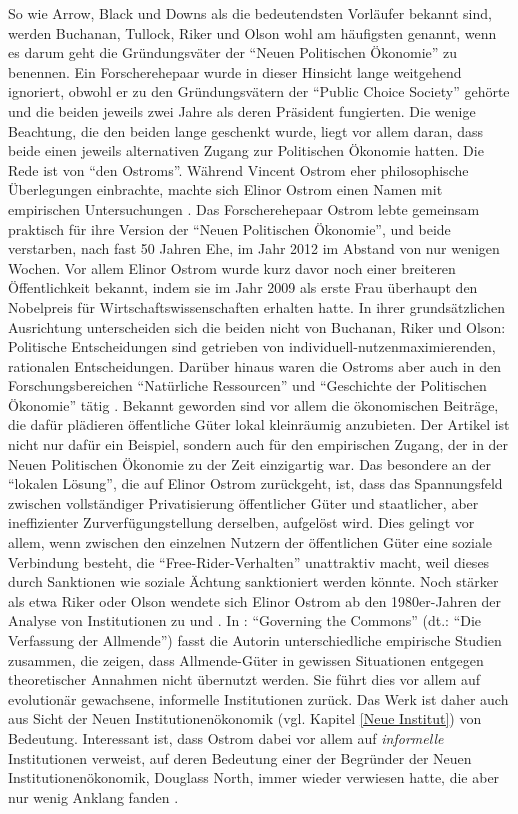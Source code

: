 So wie Arrow, Black und Downs als die bedeutendsten Vorläufer bekannt sind, werden Buchanan, Tullock, Riker und Olson wohl am häufigsten genannt, wenn es darum geht die Gründungsväter der "`Neuen Politischen Ökonomie"' zu benennen. Ein Forscherehepaar wurde in dieser Hinsicht lange weitgehend ignoriert, obwohl er zu den Gründungsvätern der "`Public Choice Society"' gehörte und die beiden jeweils zwei Jahre als deren Präsident fungierten. Die wenige Beachtung, die den beiden lange geschenkt wurde, liegt vor allem daran, dass beide einen jeweils alternativen Zugang zur Politischen Ökonomie hatten. Die Rede ist von "`den Ostroms"'. Während Vincent Ostrom eher philosophische Überlegungen einbrachte, machte sich Elinor Ostrom einen Namen mit empirischen Untersuchungen \parencite[S. 110]{Mitchell1988}. Das Forscherehepaar Ostrom lebte gemeinsam praktisch für ihre Version der "`Neuen Politischen Ökonomie"', und beide verstarben, nach fast 50 Jahren Ehe, im Jahr 2012 im Abstand von nur wenigen Wochen. Vor allem Elinor Ostrom wurde kurz davor noch einer breiteren Öffentlichkeit bekannt, indem sie im Jahr 2009 als erste Frau überhaupt den Nobelpreis für Wirtschaftswissenschaften erhalten hatte. In ihrer grundsätzlichen Ausrichtung unterscheiden sich die beiden nicht von Buchanan, Riker und Olson: Politische Entscheidungen sind getrieben von individuell-nutzenmaximierenden, rationalen Entscheidungen. Darüber hinaus waren die  Ostroms aber auch in den Forschungsbereichen "`Natürliche Ressourcen"' und "`Geschichte der Politischen Ökonomie"' tätig \textcite[S. 111]{Mitchell1988}. Bekannt geworden sind vor allem die ökonomischen Beiträge, die dafür plädieren öffentliche Güter lokal kleinräumig anzubieten. Der Artikel \textcite{Ostrom1973} ist nicht nur dafür ein Beispiel, sondern auch für den empirischen Zugang, der in der Neuen Politischen Ökonomie zu der Zeit einzigartig war. Das besondere an der "`lokalen Lösung"', die auf Elinor Ostrom zurückgeht, ist, dass das Spannungsfeld zwischen vollständiger Privatisierung öffentlicher Güter und staatlicher, aber ineffizienter Zurverfügungstellung derselben, aufgelöst wird. Dies gelingt vor allem, wenn zwischen den einzelnen Nutzern der öffentlichen Güter eine soziale Verbindung besteht, die "`Free-Rider-Verhalten"' unattraktiv macht, weil dieses durch Sanktionen wie soziale Ächtung sanktioniert werden könnte. Noch stärker als etwa Riker oder Olson wendete sich Elinor Ostrom ab den 1980er-Jahren der Analyse von Institutionen zu \parencite{Ostrom1986} und \parencite{Ostrom1990}. In \textcite{Ostrom1990}: "`Governing the Commons"' (dt.: "`Die Verfassung der Allmende"') fasst die Autorin unterschiedliche empirische Studien zusammen, die zeigen, dass Allmende-Güter in gewissen Situationen entgegen theoretischer Annahmen nicht übernutzt werden. Sie führt dies vor allem auf evolutionär gewachsene, informelle Institutionen zurück. Das Werk ist daher auch aus Sicht der Neuen Institutionenökonomik (vgl. Kapitel \ref{Neue Institut}) von Bedeutung. Interessant ist, dass Ostrom dabei vor allem auf \textit{informelle} Institutionen verweist, auf deren Bedeutung einer der Begründer der Neuen Institutionenökonomik, Douglass North, immer wieder verwiesen hatte, die aber nur wenig Anklang fanden \parencite[S. 23]{Menard2014}.


